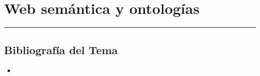 \chapter{Web semántica y ontologías}






\bigskip
\noindent\rule{\textwidth}{0.4pt} 

\section*{Bibliografía del Tema}

\begin{itemize}
    \item
\end{itemize}
\newpage